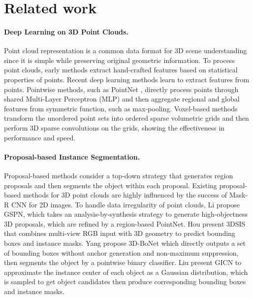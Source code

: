 \documentclass[10pt,twocolumn,letterpaper]{article}
\begin{document}
	\section{Related work}
	\paragraph{Deep Learning on 3D Point Clouds. }
	Point cloud representation is a common data format for 3D scene understanding since it is simple while preserving original geometric information. To process point clouds, early methods \cite{aubry2011wave,rusu2009fast,rusu2008aligning,bronstein2010scale} extract hand-crafted features based on statistical properties of points. Recent deep learning methods learn to extract features from points. Pointwise methods, such as PointNet \cite{qi2017pointnet,qi2017pointnet++}, directly process points through shared Multi-Layer Perceptron (MLP) and then aggregate regional and global features from symmetric function, such as max-pooling. Voxel-based methods \cite{graham20183d,choy20194d,maturana2015voxnet,Riegler2017OctNet} transform the unordered point sets into ordered sparse volumetric grids and then perform 3D sparse convolutions on the grids, showing the effectiveness in performance and speed. 
	
	
	
	\paragraph{Proposal-based Instance Segmentation.}
	Proposal-based methods consider a top-down strategy that generates region proposals and then segments the object within each proposal. Existing proposal-based methods for 3D point clouds are highly influenced by the success of Mask-R CNN for 2D images. To handle data irregularity of point clouds,  Li \etal \cite{yi2019gspn} propose GSPN, which takes an analysis-by-synthesis strategy to generate high-objectness 3D proposals, which are refined by a region-based PointNet. Hou \etal \cite{hou20193d} present 3DSIS that combines multi-view RGB input with 3D geometry to predict bounding boxes and instance masks. Yang \etal \cite{yang2019learning} propose 3D-BoNet which directly outputs a set of bounding boxes without anchor generation and non-maximum suppression, then segments the object by a pointwise binary classifier. Liu \etal \cite{liu2020learning} present GICN to approximate the instance center of each object as a Gaussian distribution, which is sampled to get object candidates then produce corresponding bounding boxes and instance masks. 
	
\end{document}
